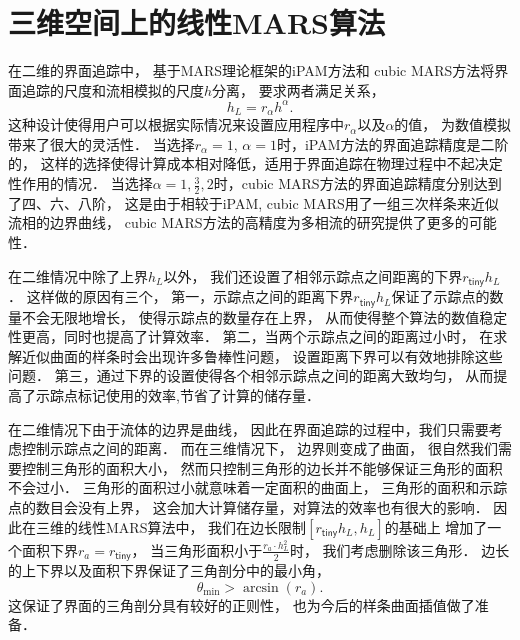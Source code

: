 \chapter{三维空间上的线性MARS算法}
在二维的界面追踪中，
基于MARS理论框架的iPAM方法\cite{zhang14:iPAM}和
cubic MARS方法\cite{zhang18:cubicMARS}将界面追踪的尺度和流相模拟的尺度$h$分离，
要求两者满足关系，
\begin{equation}
h_L=r_{\alpha}h^{\alpha}.
\end{equation}
这种设计使得用户可以根据实际情况来设置应用程序中$r_{\alpha}$以及$\alpha$的值，
为数值模拟带来了很大的灵活性．
当选择$r_{\alpha}=1$, $\alpha=1$时，iPAM方法的界面追踪精度是二阶的，
这样的选择使得计算成本相对降低，适用于界面追踪在物理过程中不起决定性作用的情况．
当选择$\alpha=1,\frac{3}{2}, 2$时，cubic MARS方法的界面追踪精度分别达到了四、六、八阶，
这是由于相较于iPAM, cubic MARS用了一组三次样条来近似流相的边界曲线，
cubic MARS方法的高精度为多相流的研究提供了更多的可能性．


在二维情况中除了上界$h_L$以外，
我们还设置了相邻示踪点之间距离的下界$r_{\mathsf{tiny}}h_L$． 
这样做的原因有三个，
第一，示踪点之间的距离下界$r_{\mathsf{tiny}}h_L$保证了示踪点的数量不会无限地增长，
使得示踪点的数量存在上界，
从而使得整个算法的数值稳定性更高，同时也提高了计算效率．
第二，当两个示踪点之间的距离过小时，
在求解近似曲面的样条时会出现许多鲁棒性问题\cite{kettner08:_class_examp_of_robus_probl}，
设置距离下界可以有效地排除这些问题．
第三，通过下界的设置使得各个相邻示踪点之间的距离大致均匀，
从而提高了示踪点标记使用的效率,节省了计算的储存量．


在二维情况下由于流体的边界是曲线，
因此在界面追踪的过程中，我们只需要考虑控制示踪点之间的距离．
而在三维情况下，
边界则变成了曲面，
很自然我们需要控制三角形的面积大小，
然而只控制三角形的边长并不能够保证三角形的面积不会过小．
三角形的面积过小就意味着一定面积的曲面上，
三角形的面积和示踪点的数目会没有上界，
这会加大计算储存量，对算法的效率也有很大的影响．
因此在三维的线性MARS算法中，
我们在边长限制$[r_{\mathsf{tiny}}h_L,h_L]$的基础上
增加了一个面积下界$r_a=r_{\mathsf{tiny}}$，
当三角形面积小于$\frac{r_a\cdot h_L^2}{2}$时，
我们考虑删除该三角形．
边长的上下界以及面积下界保证了三角剖分中的最小角，
\begin{equation}
\label{eq:minAngle}
\theta_{\mathrm{min}}>\arcsin (r_a).
\end{equation}
这保证了界面的三角剖分具有较好的正则性，
也为今后的样条曲面插值做了准备．

